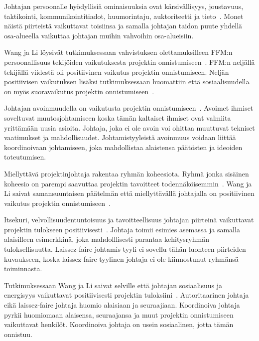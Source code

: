 \documentclass[finnish]{tktltiki2}
\theoremstyle{definition}
\theoremstyle{remark}
\begin{document}
Johtajan persoonalle hyödyllisiä ominaisuuksia ovat kärsivällisyys, joustavuus, taktikointi, kommunikointitiadot, huumorintaju, auktoriteetti ja tieto~\cite{4017705}. Monet näistä piirteistä vaikuttavat toisiinsa ja samalla johtajan taidon puute yhdellä osa-alueella vaikuttaa johtajan muihin vahvoihin osa-alueisiin. 

Wang ja Li löysivät tutkimuksessaan vahvistuksen olettamuksilleen FFM:n persoonallisuus tekijöiden vaikutuksesta projektin onnistumiseen~\cite{Wang:2009:PMP:1639950.1640049}. FFM:n neljällä tekijällä viidestä oli positiivinen vaikutus projektin onnistumiseen. Neljän positiivisen vaikutuksen lisäksi tutkimuksessaan huomattiin että sosiaalisuudella on myös suoravaikutus projektin onnistumiseen~\cite{Wang:2009:PMP:1639950.1640049}. 

Johtajan avoinmuudella on vaikutusta projektin onnistumiseen~\cite{Wang:2009:PMP:1639950.1640049}. Avoimet ihmiset soveltuvat muutosjohtamiseen koska tämän kaltaiset ihmiset ovat valmiita yrittämään uusia asioita. Johtaja, joka ei ole avoin voi ohittaa muuttuvat tekniset vaatimukset ja mahdollisuudet. Johtamistyyleistä avoinmuus voidaan liittää koordinoivaan johtamiseen, joka mahdollistaa alaistensa päätösten ja ideoiden toteutumisen.

Miellyttävä projektinjohtaja rakentaa ryhmän koheesiota. Ryhmä jonka sisäinen koheesio on parempi saavuttaa projektin tavoitteet todennäköisemmin~\cite{bahli2005group}. Wang ja Li saivat samansuuntaisen päätelmän että miellyttävällä johtajalla on positiivinen vaikutus projektin onnistumiseen~\cite{Wang:2009:PMP:1639950.1640049}.

Itsekuri, velvollisuudentuntoisuus ja tavoitteellisuus johtajan piirteinä vaikuttavat projektin tulokseen positiivisesti~\cite{Wang:2009:PMP:1639950.1640049}. Johtaja toimii esimies asemassa ja samalla alaisilleen esimerkkinä, joka mahdolllisesti parantaa kehitysryhmän tuloksellisuutta. Laissez-faire johtamis tyyli ei sovellu tähän luonteen piirteiden kuvaukseen, koska laissez-faire tyylinen johtaja ei ole kiinnostunut ryhmänsä toiminnasta. 

Tutkimuksessaan Wang ja Li saivat selville että johtajan sosiaalisuus ja energisyys vaikuttavat positiivisesti  projektin tuloksiini~\cite{Wang:2009:PMP:1639950.1640049}. Autoritaarinen johtaja eikä laissez-faire johtaja huomio alaisiaan ja seuraajiaan. Koordinoiva johtaja pyrkii huomiomaan alaisensa, seuraajansa ja muut projektin onnistumiseen vaikuttavat henkilöt. Koordinoiva johtaja on usein sosiaalinen, jotta tämän onnistuu. 
\end{document}
